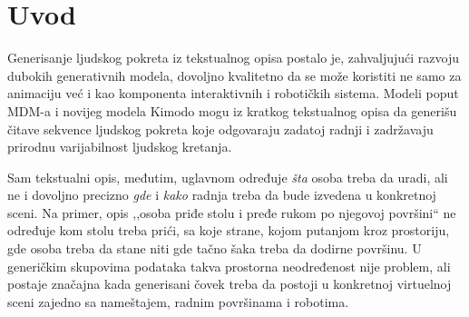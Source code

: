 \documentclass{article}
\begin{document}
\begin{abstract}

Difuzioni modeli ljudskog pokreta omogućavaju generisanje raznovrsnih i uverljivih pokreta iz tekstualnog opisa, ali njihova praktična vrednost u interaktivnim i robotičkim primenama zavisi od toga koliko prirodno korisnik može da zada prostorna i vremenska ograničenja koja generisani pokret mora da ispuni. Ovaj rad predstavlja sistem u kome se ograničenja zadaju \emph{demonstracijom}: korisnik u virtuelnoj realnosti (ili u ekvivalentnom simuliranom režimu na ekranu) pokazuje putanju kretanja, tačke dodira na površinama i ključne poze tela, a sistem od tih demonstracija sastavlja skup kinematičkih ograničenja za difuzioni model pokreta Kimodo. Generisani pokret se zatim reprodukuje u istoj sceni, na skinovanom humanoidnom karakteru, među nameštajem i robotskim manipulatorima sa kojima virtuelni čovek treba da deli prostor.

Sistem je realizovan kao klijent--server arhitektura: Unity klijent (OpenXR za VR, sa punom podrškom za rad bez opreme) zadužen je za scenu, interakciju i reprodukciju, dok serverska strana (FastAPI, PyTorch) izvršava generisanje i naknadnu obradu pokreta. Pošto model pokreta nema svest o sceni, klijent planira putanje prilaska koje zaobilaze prepreke i prevodi ih u ograničenja putanje korena tela. Rad opisuje ideju sistema, korišćene modele i tehnologije, ključne detalje implementacije, jedan reprezentativan scenario upotrebe, kao i ostvarene rezultate i ograničenja.

\end{abstract}

\section{Uvod}
\label{sec:introduction}

Generisanje ljudskog pokreta iz tekstualnog opisa postalo je, zahvaljujući razvoju dubokih generativnih modela, dovoljno kvalitetno da se može koristiti ne samo za animaciju već i kao komponenta interaktivnih i robotičkih sistema. Modeli poput MDM-a \cite{tevet2022humanmotiondiffusionmodel} i novijeg modela Kimodo \cite{rempe2026kimodo} mogu iz kratkog tekstualnog opisa da generišu čitave sekvence ljudskog pokreta koje odgovaraju zadatoj radnji i zadržavaju prirodnu varijabilnost ljudskog kretanja.

Sam tekstualni opis, međutim, uglavnom određuje \emph{šta} osoba treba da uradi, ali ne i dovoljno precizno \emph{gde} i \emph{kako} radnja treba da bude izvedena u konkretnoj sceni. Na primer, opis ,,osoba priđe stolu i pređe rukom po njegovoj površini`` ne određuje kom stolu treba prići, sa koje strane, kojom putanjom kroz prostoriju, gde osoba treba da stane niti gde tačno šaka treba da dodirne površinu. U generičkim skupovima podataka takva prostorna neodređenost nije problem, ali postaje značajna kada generisani čovek treba da postoji u konkretnoj virtuelnoj sceni zajedno sa nameštajem, radnim površinama i robotima.
\end{document}
